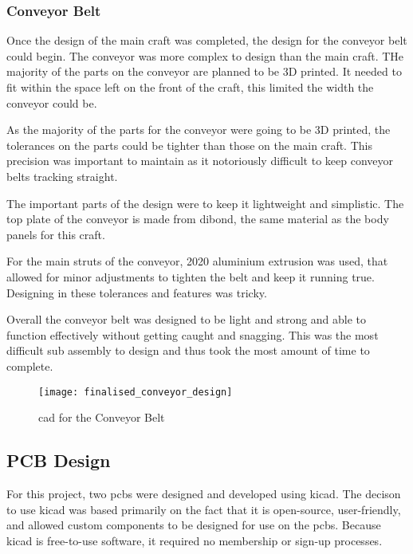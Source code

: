 \documentclass [11pt]{article}
\begin{document}
\subsubsection{Conveyor Belt}\label{sec:conveyor_cad}

Once the design of the main craft was completed, the design for the conveyor belt could begin. The conveyor was more complex to design than the main craft. THe majority of the parts on the conveyor are planned to be 3D printed. It needed to fit within the space left on the front of the craft, this limited the width the conveyor could be. 

As the majority of the parts for the conveyor were going to be 3D printed, the tolerances on the parts could be tighter than those on the main craft. This precision was important to maintain as it notoriously difficult to keep conveyor belts tracking straight.

The important parts of the design were to keep it lightweight and simplistic. The top plate of the conveyor is made from \gls{dibond}, the same material as the body panels for this craft. 

For the main struts of the conveyor, 2020 aluminium extrusion was used, that allowed for minor adjustments to tighten the belt and keep it running true. Designing in these tolerances and features was tricky.  

Overall the conveyor belt was designed to be light and strong and able to function effectively without getting caught and snagging. This was the most difficult sub assembly to design and thus took the most amount of time to complete. 
 
\begin{figure}[H]
\centerline{\texttt{[image: finalised\_conveyor\_design]}}
\caption{\gls{cad} for the Conveyor Belt}
\label{fig:finalised_conveyor+_design}
\end{figure}

\subsection{PCB Design}

For this project, two \gls{pcb}s were designed and developed using \gls{kicad}. The decison to use \gls{kicad} was based primarily on the fact that it is open-source, user-friendly, and allowed custom components to be designed for use on the \gls{pcb}s. Because \gls{kicad} is free-to-use software, it required no membership or sign-up processes. 
\end{document}
